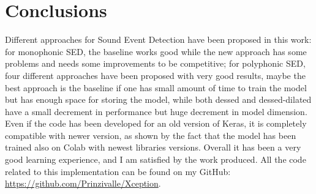 \documentclass{article}
\begin{document}
\section{Conclusions}
\label{sec:end}

Different approaches for Sound Event Detection have been proposed in this work: for monophonic SED, the baseline works good while the new approach has some problems and needs some improvements to be competitive; for polyphonic SED, four different approaches have been proposed with very good results, maybe the best approach is the baseline if one has small amount of time to train the model but has enough space for storing the model, while both dessed and dessed-dilated have a small decrement in performance but huge decrement in model dimension.\newline
Even if the code has been developed for an old version of Keras, it is completely compatible with newer version, as shown by the fact that the model has been trained also on Colab with newest libraries versions.\newline
Overall it has been a very good learning experience, and I am satisfied by the work produced. All the code related to this implementation can be found on my GitHub: \url{https://github.com/Prinzivalle/Xception}.


%





\end{document}
